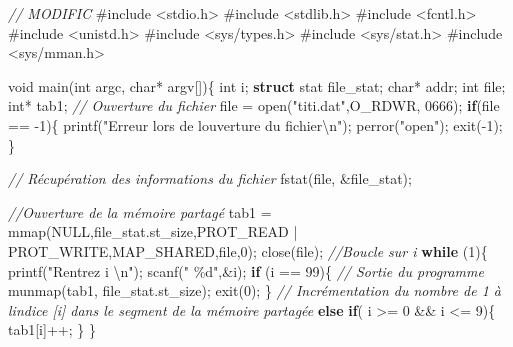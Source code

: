 \documentclass[
]{article}
\newenvironment{Shaded}{}{}
\newcommand{\BaseNTok}[1]{\textcolor[rgb]{0.25,0.63,0.44}{#1}}
\newcommand{\CommentTok}[1]{\textcolor[rgb]{0.38,0.63,0.69}{\textit{#1}}}
\newcommand{\ControlFlowTok}[1]{\textcolor[rgb]{0.00,0.44,0.13}{\textbf{#1}}}
\newcommand{\DataTypeTok}[1]{\textcolor[rgb]{0.56,0.13,0.00}{#1}}
\newcommand{\DecValTok}[1]{\textcolor[rgb]{0.25,0.63,0.44}{#1}}
\newcommand{\ImportTok}[1]{#1}
\newcommand{\KeywordTok}[1]{\textcolor[rgb]{0.00,0.44,0.13}{\textbf{#1}}}
\newcommand{\NormalTok}[1]{#1}
\newcommand{\PreprocessorTok}[1]{\textcolor[rgb]{0.74,0.48,0.00}{#1}}
\newcommand{\SpecialCharTok}[1]{\textcolor[rgb]{0.25,0.44,0.63}{#1}}
\newcommand{\StringTok}[1]{\textcolor[rgb]{0.25,0.44,0.63}{#1}}
\begin{document}
\begin{Shaded}
\begin{Highlighting}[]
\CommentTok{// MODIFIC}
\PreprocessorTok{\#include }\ImportTok{\textless{}stdio.h\textgreater{}}
\PreprocessorTok{\#include }\ImportTok{\textless{}stdlib.h\textgreater{}}
\PreprocessorTok{\#include }\ImportTok{\textless{}fcntl.h\textgreater{}}
\PreprocessorTok{\#include }\ImportTok{\textless{}unistd.h\textgreater{}}
\PreprocessorTok{\#include }\ImportTok{\textless{}sys/types.h\textgreater{}}
\PreprocessorTok{\#include }\ImportTok{\textless{}sys/stat.h\textgreater{}}
\PreprocessorTok{\#include }\ImportTok{\textless{}sys/mman.h\textgreater{}}


\DataTypeTok{void}\NormalTok{ main(}\DataTypeTok{int}\NormalTok{ argc, }\DataTypeTok{char}\NormalTok{* argv[])\{}
    \DataTypeTok{int}\NormalTok{ i;}
    \KeywordTok{struct}\NormalTok{ stat file\_stat;}
    \DataTypeTok{char}\NormalTok{* addr;}
    \DataTypeTok{int}\NormalTok{ file;}
    \DataTypeTok{int}\NormalTok{* tab1;}
     \CommentTok{// Ouverture du fichier}
\NormalTok{    file = open(}\StringTok{"titi.dat"}\NormalTok{,O\_RDWR, }\BaseNTok{0666}\NormalTok{);}
    \ControlFlowTok{if}\NormalTok{(file == {-}}\DecValTok{1}\NormalTok{)\{}
\NormalTok{        printf(}\StringTok{"Erreur lors de l\textquotesingle{}ouverture du fichier}\SpecialCharTok{\textbackslash{}n}\StringTok{"}\NormalTok{);}
\NormalTok{        perror(}\StringTok{"open"}\NormalTok{);}
\NormalTok{        exit({-}}\DecValTok{1}\NormalTok{);}
\NormalTok{    \}}
    
    \CommentTok{// Récupération des informations du fichier}
\NormalTok{    fstat(file, \&file\_stat);}

    \CommentTok{//Ouverture de la mémoire partagé}
\NormalTok{    tab1 = mmap(NULL,file\_stat.st\_size,PROT\_READ | PROT\_WRITE,MAP\_SHARED,file,}\DecValTok{0}\NormalTok{);}
\NormalTok{    close(file);}
    \CommentTok{//Boucle sur i}
    \ControlFlowTok{while}\NormalTok{ (}\DecValTok{1}\NormalTok{)\{}
\NormalTok{        printf(}\StringTok{"Rentrez i }\SpecialCharTok{\textbackslash{}n}\StringTok{"}\NormalTok{);}
\NormalTok{        scanf(}\StringTok{" \%d"}\NormalTok{,\&i);}
        \ControlFlowTok{if}\NormalTok{ (i == }\DecValTok{99}\NormalTok{)\{}
            \CommentTok{// Sortie du programme}
\NormalTok{            munmap(tab1, file\_stat.st\_size);}
\NormalTok{            exit(}\DecValTok{0}\NormalTok{);}
\NormalTok{        \}}
        \CommentTok{// Incrémentation du nombre de 1 à l\textquotesingle{}indice [i] dans le segment de la mémoire partagée}
        \ControlFlowTok{else} \ControlFlowTok{if}\NormalTok{( i \textgreater{}= }\DecValTok{0}\NormalTok{ \&\& i \textless{}= }\DecValTok{9}\NormalTok{)\{}
\NormalTok{            tab1[i]++;}
\NormalTok{        \}}
\NormalTok{    \}}


\end{Highlighting}
\end{Shaded}
\end{document}
